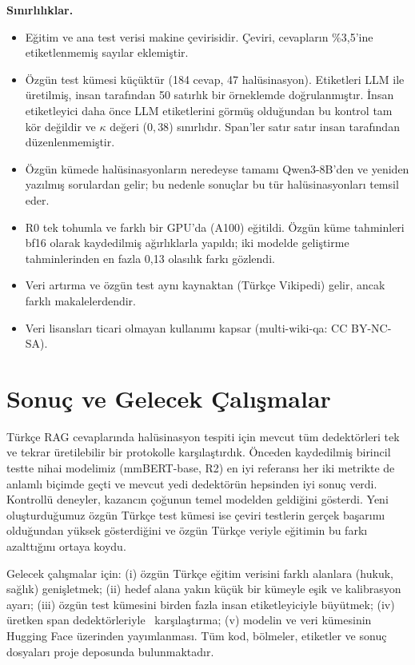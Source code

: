 \documentclass[conference,a4paper]{IEEEtran}
\begin{document}
\textbf{Sınırlılıklar.}
\begin{itemize}
\item Eğitim ve ana test verisi makine çevirisidir. Çeviri, cevapların \%3{,}5'ine etiketlenmemiş sayılar eklemiştir.
\item Özgün test kümesi küçüktür (184 cevap, 47 halüsinasyon). Etiketleri LLM ile üretilmiş, insan tarafından 50 satırlık bir örneklemde doğrulanmıştır. İnsan etiketleyici daha önce LLM etiketlerini görmüş olduğundan bu kontrol tam kör değildir ve $\kappa$ değeri ($0{,}38$) sınırlıdır. Span'ler satır satır insan tarafından düzenlenmemiştir.
\item Özgün kümede halüsinasyonların neredeyse tamamı Qwen3-8B'den ve yeniden yazılmış sorulardan gelir; bu nedenle sonuçlar bu tür halüsinasyonları temsil eder.
\item R0 tek tohumla ve farklı bir GPU'da (A100) eğitildi. Özgün küme tahminleri bf16 olarak kaydedilmiş ağırlıklarla yapıldı; iki modelde geliştirme tahminlerinden en fazla 0{,}13 olasılık farkı gözlendi.
\item Veri artırma ve özgün test aynı kaynaktan (Türkçe Vikipedi) gelir, ancak farklı makalelerdendir.
\item Veri lisansları ticari olmayan kullanımı kapsar (multi-wiki-qa: CC BY-NC-SA).
\end{itemize}

\section{Sonuç ve Gelecek Çalışmalar}

Türkçe RAG cevaplarında halüsinasyon tespiti için mevcut tüm dedektörleri tek ve tekrar üretilebilir bir protokolle karşılaştırdık. Önceden kaydedilmiş birincil testte nihai modelimiz (mmBERT-base, R2) en iyi referansı her iki metrikte de anlamlı biçimde geçti ve mevcut yedi dedektörün hepsinden iyi sonuç verdi. Kontrollü deneyler, kazancın çoğunun temel modelden geldiğini gösterdi. Yeni oluşturduğumuz özgün Türkçe test kümesi ise çeviri testlerin gerçek başarımı olduğundan yüksek gösterdiğini ve özgün Türkçe veriyle eğitimin bu farkı azalttığını ortaya koydu.

Gelecek çalışmalar için: (i) özgün Türkçe eğitim verisini farklı alanlara (hukuk, sağlık) genişletmek; (ii) hedef alana yakın küçük bir kümeyle eşik ve kalibrasyon ayarı; (iii) özgün test kümesini birden fazla insan etiketleyiciyle büyütmek; (iv) üretken span dedektörleriyle~\cite{dong2026sopo,su2025rl4hs} karşılaştırma; (v) modelin ve veri kümesinin Hugging Face üzerinden yayımlanması. Tüm kod, bölmeler, etiketler ve sonuç dosyaları proje deposunda bulunmaktadır.
\end{document}
